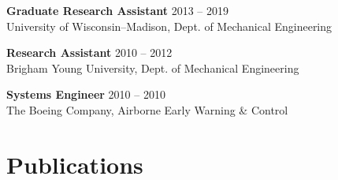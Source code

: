 \documentclass[letterpaper, 10pt]{article}
\begin{document}
\textbf{Graduate Research Assistant}
\hfill 2013 -- 2019\\ %
University of Wisconsin–Madison, Dept. of Mechanical Engineering  %
\medskip

\textbf{Research Assistant}
\hfill 2010 -- 2012\\ %
Brigham Young University, Dept. of Mechanical Engineering %
\medskip

\textbf{Systems Engineer}
\hfill 2010 -- 2010\\ %
The Boeing Company, Airborne Early Warning \& Control %

\section{Publications}

%
\end{document}
